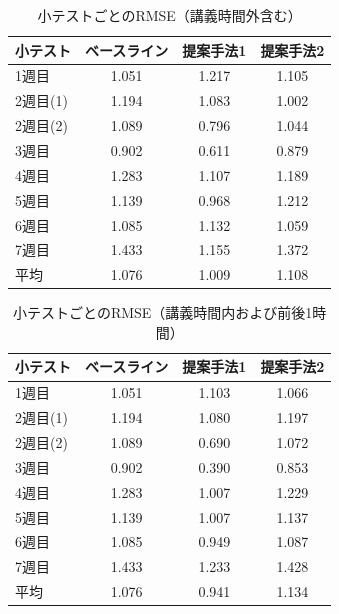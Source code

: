 \documentclass[a4paper,12pt]{ltjsreport}
\begin{document}
\begin{table}[tbp]
  \centering
  \caption{小テストごとのRMSE（講義時間外含む）}
  \label{tb:rmse_each_soto2}
  \begin{tabular}{l||c|c|c}
    小テスト & ベースライン & 提案手法1 & 提案手法2 \\ \hline\hline
    1週目 & 1.051 & 1.217 & 1.105 \\ \hline
    2週目(1)  & 1.194 & 1.083 & 1.002 \\ \hline
    2週目(2)  & 1.089 & 0.796 & 1.044 \\ \hline
    3週目 & 0.902 & 0.611 & 0.879 \\ \hline
    4週目 & 1.283 & 1.107 & 1.189 \\ \hline
    5週目 & 1.139 & 0.968 & 1.212 \\ \hline
    6週目 & 1.085 & 1.132 & 1.059 \\ \hline
    7週目 & 1.433 & 1.155 & 1.372 \\ \hline\hline
    平均 & 1.076 & 1.009 & 1.108 \\ \hline
  \end{tabular}
\end{table}

\begin{table}[tbp]
  \centering
  \caption{小テストごとのRMSE（講義時間内および前後1時間）}
  \label{tb:rmse_each_nai2}
  \begin{tabular}{l||c|c|c}
    小テスト & ベースライン & 提案手法1 & 提案手法2 \\ \hline\hline
    1週目 & 1.051 & 1.103 & 1.066 \\ \hline
    2週目(1)  & 1.194 & 1.080 & 1.197 \\ \hline
    2週目(2)  & 1.089 & 0.690 & 1.072 \\ \hline
    3週目 & 0.902 & 0.390 & 0.853 \\ \hline
    4週目 & 1.283 & 1.007 & 1.229 \\ \hline
    5週目 & 1.139 & 1.007 & 1.137 \\ \hline
    6週目 & 1.085 & 0.949 & 1.087 \\ \hline
    7週目 & 1.433 & 1.233 & 1.428 \\ \hline\hline
    平均 & 1.076 & 0.941 & 1.134 \\ \hline
  \end{tabular}
\end{table}

\end{document}
